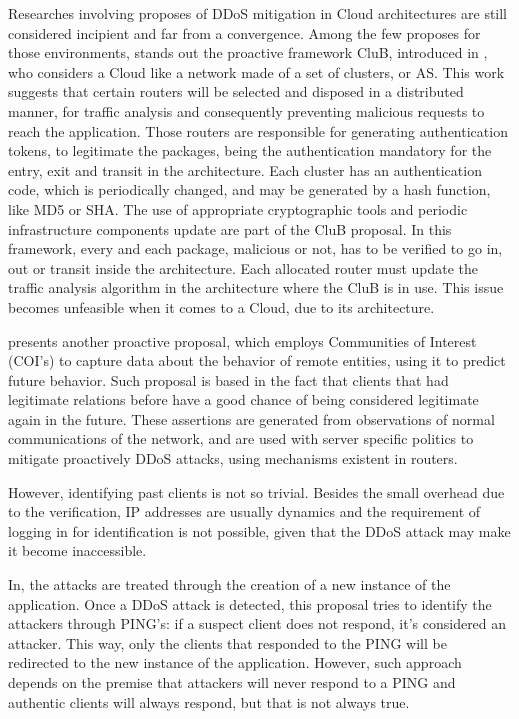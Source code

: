 
Researches involving proposes of DDoS mitigation in Cloud architectures are still considered incipient and far from a convergence. Among the few proposes for those environments, stands out the proactive framework CluB, introduced in \cite{Hazelhurst:2008:SCU:1456659.1456671}, who considers a Cloud like a network made of a set of clusters, or AS. This work suggests that certain routers will be selected and disposed in a distributed manner, for traffic analysis and consequently preventing malicious requests to reach the application. Those routers are responsible for generating authentication tokens, to legitimate the packages, being the authentication mandatory for the entry, exit and transit in the architecture. Each cluster has an authentication code, which is periodically changed, and may be generated by a hash function, like MD5 or SHA. The use of appropriate cryptographic tools and periodic infrastructure components update are part of the CluB proposal. In this framework, every and each package, malicious or not, has to be verified to go in, out or transit inside the architecture. Each allocated router must update the traffic analysis algorithm in the architecture where the CluB is in use. This issue becomes unfeasible when it comes to a Cloud, due to its architecture.


\cite{Verkaik:2006:PCD:1162666.1162673} presents another proactive proposal, which employs Communities of Interest (COI's) to capture data about the behavior of remote entities, using it to predict future behavior. Such proposal is based in the fact that clients that had legitimate relations before have a good chance of being considered legitimate again in the future. These assertions are generated from observations of normal communications of the network, and are used with server specific politics to mitigate proactively DDoS attacks, using mechanisms existent in routers.

However, identifying past clients is not so trivial. Besides the small overhead due to the verification, IP addresses are usually dynamics and the requirement of logging in for identification is not possible, given that the DDoS attack may make it become inaccessible.


In\cite{Bakshi:10}, the attacks are treated through the creation of a new instance of the application. Once a DDoS attack is detected, this proposal tries to identify the attackers through PING's: if a suspect client does not respond, it's considered an attacker. This way, only the clients that responded to the PING will be redirected to the new instance of the application. However, such approach depends on the premise that attackers will never respond to a PING and authentic clients will always respond, but that is not always true.


